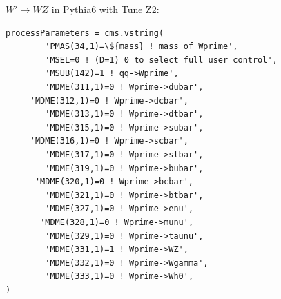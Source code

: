 $W' \to WZ$ in Pythia6 with Tune Z2:
\begin{verbatim}
processParameters = cms.vstring(
        'PMAS(34,1)=\${mass} ! mass of Wprime',
        'MSEL=0 ! (D=1) 0 to select full user control',
        'MSUB(142)=1 ! qq->Wprime',
        'MDME(311,1)=0 ! Wprime->dubar',   
     'MDME(312,1)=0 ! Wprime->dcbar',
        'MDME(313,1)=0 ! Wprime->dtbar',
        'MDME(315,1)=0 ! Wprime->subar',       
	 'MDME(316,1)=0 ! Wprime->scbar',
        'MDME(317,1)=0 ! Wprime->stbar',
        'MDME(319,1)=0 ! Wprime->bubar',      
	  'MDME(320,1)=0 ! Wprime->bcbar',
        'MDME(321,1)=0 ! Wprime->btbar',
        'MDME(327,1)=0 ! Wprime->enu',     
	   'MDME(328,1)=0 ! Wprime->munu',
        'MDME(329,1)=0 ! Wprime->taunu',
        'MDME(331,1)=1 ! Wprime->WZ',
        'MDME(332,1)=0 ! Wprime->Wgamma',
        'MDME(333,1)=0 ! Wprime->Wh0',
)
\end{verbatim}






